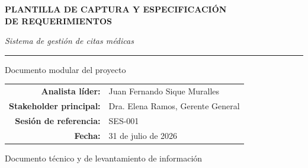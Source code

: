 \documentclass[12pt,a4paper]{article}
\begin{document}
\begin{titlepage}
\centering
\vspace*{1.1cm}
{\sffamily\color{azulplantilla}\Huge\bfseries PLANTILLA DE CAPTURA Y ESPECIFICACIÓN\\[0.2em] DE REQUERIMIENTOS\par}
\vspace{0.35cm}
{\itshape\color{gristexto}\large Sistema de gestión de citas médicas\par}
\vspace{1.5cm}
\rule{0.82\linewidth}{1pt}\par
\vspace{1.2cm}
{\sffamily\color{azuloscuro}\Large Documento modular del proyecto\par}
\vfill
\begin{tabular}{rl}
\textbf{Analista líder:} & Juan Fernando Sique Muralles\\
\textbf{Stakeholder principal:} & Dra. Elena Ramos, Gerente General\\
\textbf{Sesión de referencia:} & SES-001\\
\textbf{Fecha:} & 31 de julio de 2026\\
\end{tabular}
\vfill
{\sffamily\color{azuloscuro}\large Documento técnico y de levantamiento de información\par}
\end{titlepage}

\tableofcontents
\newpage

%
%

\clearpage
%
\clearpage
\setcounter{section}{0}

\end{document}
